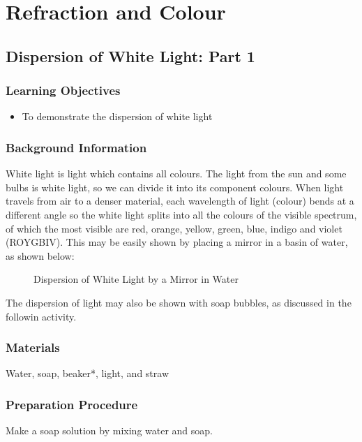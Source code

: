 \section{Refraction and Colour}

\subsection{Dispersion of White Light: Part 1}

\subsubsection*{Learning Objectives}
\begin{itemize}
\item{To demonstrate the dispersion of white light} 
\end{itemize}

\subsubsection*{Background Information}
White light is light which contains all colours.  The light from the sun and some bulbs is white light, so we can divide it into its component colours.  When light travels from air to a denser material, each wavelength of light (colour) bends at a different angle so the white light splits into all the colours of the visible spectrum, of which the most visible are red, orange, yellow, green, blue, indigo and violet (ROYGBIV). This may be easily shown by placing a mirror in a basin of water, as shown below:

\begin{figure}
\begin{center}
\def\svgwidth{150pt}

\caption{Dispersion of White Light by a Mirror in Water}
\label{fig:dispersion-white-light}
\end{center}
\end{figure}

The dispersion of light may also be shown with soap bubbles, as discussed in the followin activity.

\subsubsection*{Materials}
Water, soap, beaker*, light, and straw

\subsubsection*{Preparation Procedure}
Make a soap solution by mixing water and soap.

